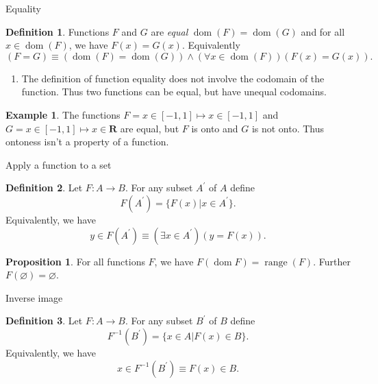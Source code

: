 \documentclass[fleqn]{beamer}
\newcommand{\reals}{\mathbf{R}}
\DeclareMathOperator{\range}{range}
\DeclareMathOperator{\dom}{dom}
\theoremstyle{definition}
\newtheorem{mydef}{Definition}
\newtheorem{myex}{Example}
\newtheorem{myth}{Proposition}
\begin{document}
\begin{frame}{Equality}

\begin{mydef} Functions \(F\) and \(G\) are \emph{equal }  \(\dom(F) = \dom(G)\) and for all \(x \in \dom(F) \), we have \(F(x) = G(x)\).  Equivalently
\[
  (F = G) \equiv (\dom(F) = \dom(G)) \land (\forall  x \in \dom(F))(F(x) = G(x)).
\]
\end{mydef}

\begin{enumerate}
\item The definition of function equality does not involve the codomain of the function. Thus two functions can be equal, but have unequal codomains.
\end{enumerate}

\begin{myex}  The functions \(F = x \in [-1,1] \mapsto x \in [-1,1]\) and  \(G = x \in [-1,1] \mapsto x \in \reals \)  are equal, but \(F\) is onto and \(G\) is not onto. Thus
ontoness isn't a  property of a function. \end{myex}


\end{frame}




\begin{frame}{Apply a function to a set}

\begin{mydef}  Let \(F : A \to B\).  For any subset \(A^\prime\) of \(A\) define
\[
    F(A^\prime) = \{ F(x) | x \in A^\prime \}.
\]
Equivalently, we have
\[
  y \in F(A^\prime)  \equiv (\exists x \in A^\prime)(y = F(x)).
\]
\end{mydef}

\begin{myth} For all functions \(F\), we have \(F(\dom{F}) = \range(F) \).   Further \(F(\varnothing) = \varnothing \). \end{myth}


\end{frame}

\begin{frame}{Inverse image}

\begin{mydef}  Let \(F : A \to B\).  For any subset \(B^\prime\) of \(B\) define
\[
    F^{-1} (B^\prime) = \{ x \in A  | F(x) \in B \}.
\]
Equivalently, we have
\[
  x  \in F^{-1} (B^\prime)  \equiv F(x) \in B.
\]
\end{mydef}
\end{frame}
\end{document}
